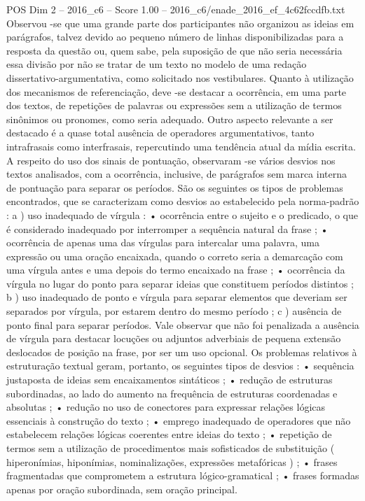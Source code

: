\begin{textsample}{POS Dim 2 – 2016\_c6 – Score 1.00 – 2016\_c6/enade\_2016\_ef\_4c62fccdfb.txt}
Observou -se que uma grande parte dos participantes não organizou as ideias em parágrafos, talvez devido ao pequeno número de linhas disponibilizadas para a resposta da questão ou, quem sabe, pela suposição de que não seria necessária essa divisão por não se tratar de um texto no modelo de uma redação dissertativo-argumentativa, como solicitado nos vestibulares.
Quanto à utilização dos mecanismos de referenciação, deve -se destacar a ocorrência, em uma parte dos textos, de repetições de palavras ou expressões sem a utilização de termos sinônimos ou pronomes, como seria adequado.
Outro aspecto relevante a ser destacado é a quase total ausência de operadores argumentativos, tanto intrafrasais como interfrasais, repercutindo uma tendência atual da mídia escrita.
A respeito do uso dos sinais de pontuação, observaram -se vários desvios nos textos analisados, com a ocorrência, inclusive, de parágrafos sem marca interna de pontuação para separar os períodos.
São os seguintes os tipos de problemas encontrados, que se caracterizam como desvios ao estabelecido pela norma-padrão : a ) uso inadequado de vírgula : • ocorrência entre o sujeito e o predicado, o que é considerado inadequado por interromper a sequência natural da frase ; • ocorrência de apenas uma das vírgulas para intercalar uma palavra, uma expressão ou uma oração encaixada, quando o correto seria a demarcação com uma vírgula antes e uma depois do termo encaixado na frase ; • ocorrência da vírgula no lugar do ponto para separar ideias que constituem períodos distintos ; b ) uso inadequado de ponto e vírgula para separar elementos que deveriam ser separados por vírgula, por estarem dentro do mesmo período ; c ) ausência de ponto final para separar períodos.
Vale observar que não foi penalizada a ausência de vírgula para destacar locuções ou adjuntos adverbiais de pequena extensão deslocados de posição na frase, por ser um uso opcional.
Os problemas relativos à estruturação textual geram, portanto, os seguintes tipos de desvios : • sequência justaposta de ideias sem encaixamentos sintáticos ; • redução de estruturas subordinadas, ao lado do aumento na frequência de estruturas coordenadas e absolutas ; • redução no uso de conectores para expressar relações lógicas essenciais à construção do texto ; • emprego inadequado de operadores que não estabelecem relações lógicas coerentes entre ideias do texto ; • repetição de termos sem a utilização de procedimentos mais sofisticados de substituição ( hiperonímias, hiponímias, nominalizações, expressões metafóricas ) ; • frases fragmentadas que comprometem a estrutura lógico-gramatical ; • frases formadas apenas por oração subordinada, sem oração principal.

\end{textsample}
